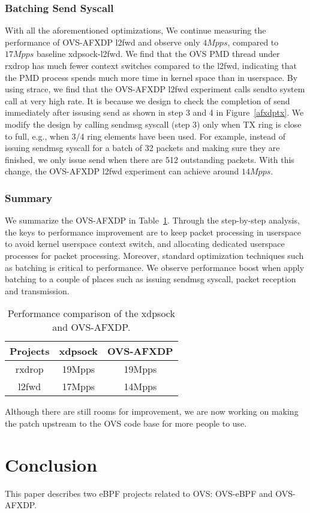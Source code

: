 \documentclass[10pt]{sigplanconf}
\begin{document}
\subsubsection{Batching Send Syscall}
With all the aforementioned optimizations, We continue measuring the
performance of OVS-AFXDP l2fwd and observe only $4Mpps$, compared to
$17Mpps$ baseline xdpsock-l2fwd.
We find that the OVS PMD thread under rxdrop has much fewer context
switches compared to the l2fwd, indicating that
the PMD process spends much more time in kernel space than in userspace.
By using strace, we find that the OVS-AFXDP l2fwd experiment calls sendto
system call at very high rate. It is because we design to check the
completion of send immediately after issusing send as shown in step 3 and
4 in Figure~\ref{afxdptx}.
We modify the design by calling sendmsg syscall (step 3) only when TX ring is
close to full, e.g., when 3/4 ring elements have been used.
For example, instead of issuing sendmsg syscall for a batch of 32 packets
and making sure they are finished, we only issue send when there are 512
outstanding packets.  With this change, the OVS-AFXDP l2fwd experiment
can achieve around $14Mpps$.

\subsubsection{Summary}
We summarize the OVS-AFXDP in Table~\ref{compare}.
Through the step-by-step analysis, the keys to performance improvement are to
keep packet processing in userspace to avoid kernel userspace context switch,
and allocating dedicated userspace processes for packet processing.
Moreover, standard optimization techniques such as batching is critical
to performance. We observe performance boost when apply batching to a couple
of places such as issuing sendmsg syscall, packet reception and transmission.
\begin{table}
\centering
\small
\begin{tabular}{|c | c | c|}
\hline
 {\bf Projects} & {\bf xdpsock } & {\bf OVS-AFXDP} \\ \hline\hline
  rxdrop & 19Mpps & 19Mpps \\ \hline
  l2fwd  & 17Mpps & 14Mpps \\ \hline
  \end{tabular}
\caption{\footnotesize
Performance comparison of the xdpsock and OVS-AFXDP.
}
\label{compare}
\end{table}

Although there are still rooms for improvement, we are now working on
making the patch upstream to the OVS code base for more people to use.

\section{Conclusion}
\label{sec:conclusion}
This paper describes two eBPF projects related to OVS: OVS-eBPF and OVS-AFXDP.



\end{document}

